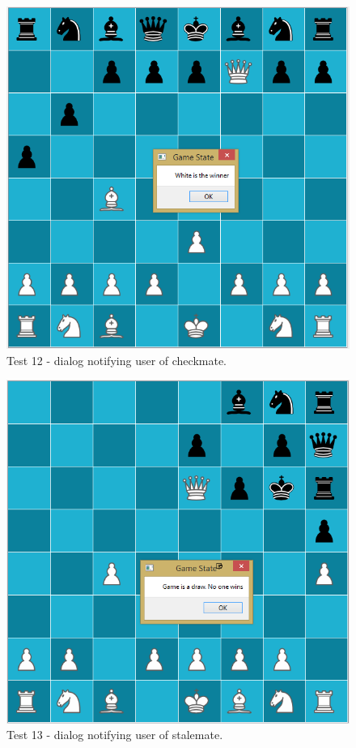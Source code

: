 \begin{figure}[H]
	\centering
	\includegraphics[width=1.0\textwidth]{images/screenshots/test-12}
	\caption{Test 12 - dialog notifying user of checkmate.}
	\label{test-12}
\end{figure}
\begin{figure}[H]
	\centering
	\includegraphics[width=1.0\textwidth]{images/screenshots/test-13}
	\caption{Test 13 - dialog notifying user of stalemate.}
	\label{test-13}
\end{figure}
